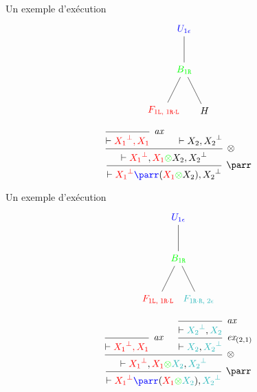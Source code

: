 \documentclass{beamer}
\newcommand*{\orth}{^\perp}
\newcommand*{\tensor}{\otimes}
\newcommand*{\hypv}[1]{\hypo{\vdash #1}}
\newcommand*{\axv}[1]{\infer{0}[\ensuremath{\mathit{ax}}]{\vdash #1}}
\newcommand*{\tensorv}[1]{\infer{2}[\ensuremath{\tensor}]{\vdash #1}}
\newcommand*{\parrv}[1]{\infer{1}[\ensuremath{\parr}]{\vdash #1}}
\newcommand*{\permv}[2]{\infer{1}[\ensuremath{\textit{ex}_{#1}}]{\vdash #2}}
\newcommand*{\Left}{\textnormal{\texttt{L}}}
\newcommand*{\Right}{\textnormal{\texttt{R}}}
\newcommand*{\unknown}{H}
\begin{document}
\begin{frame}{Un exemple d'exécution}
    \begin{equation*}
    \begin{tikzpicture}%
        [level 2/.style={sibling distance=1.5cm}]
        \node {$\textcolor{blue}{U_{1 \epsilon}}$}
        child {node {$\textcolor{green}{B_{1 \Right}}$}
            child {node {$\textcolor{red}{F_{1 \Left, \; 1 \Right \cdot \Left}}$}}
            child {node {$\unknown$}}
        };
    \end{tikzpicture}
    \end{equation*}
    \begin{equation*}
        \begin{prooftree}
                  \axv{\textcolor{red}{{X_1}\orth, X_1}}
            
                  \hypv{X_2, {X_2}\orth}
               \tensorv{\textcolor{red}{{X_1}\orth}, \textcolor{red}{X_1} \textcolor{green}{\tensor} X_2, {X_2}\orth}
            \parrv{\textcolor{red}{{X_1}\orth} \textcolor{blue}{\parr} (\textcolor{red}{X_1} \textcolor{green}{\tensor} X_2), {X_2}\orth}
        \end{prooftree}
    \end{equation*}
\end{frame}

\begin{frame}{Un exemple d'exécution}
    \begin{equation*}
    \begin{tikzpicture}%
        [level 2/.style={sibling distance=1.5cm}]
        \node {$\textcolor{blue}{U_{1 \epsilon}}$}
        child {node {$\textcolor{green}{B_{1 \Right}}$}
            child {node {$\textcolor{red}{F_{1 \Left, \; 1 \Right \cdot \Left}}$}}
            child {node {$\textcolor{Aquamarine}{F_{1 \Right \cdot \Right, \; 2 \epsilon}}$}}
        };
    \end{tikzpicture}
    \end{equation*}
    \begin{equation*}
        \begin{prooftree}
            \axv{\textcolor{red}{{X_1}\orth, X_1}}
            \axv{\textcolor{Aquamarine}{{X_2}\orth}, \textcolor{Aquamarine}{X_2}}
            \permv{(2, 1)}{\textcolor{Aquamarine}{X_2}, \textcolor{Aquamarine}{{X_2}\orth}}
            \tensorv{\textcolor{red}{{X_1}\orth}, \textcolor{red}{X_1} \textcolor{green}{\tensor} \textcolor{Aquamarine}{X_2}, \textcolor{Aquamarine}{{X_2}\orth}}
            \parrv{\textcolor{red}{\textcolor{red}{{X_1}\orth}} \textcolor{blue}{\parr} (\textcolor{red}{X_1} \textcolor{green}{\tensor} \textcolor{Aquamarine}{X_2}), \textcolor{Aquamarine}{{X_2}\orth}}
        \end{prooftree}
    \end{equation*}
\end{frame}
\end{document}
